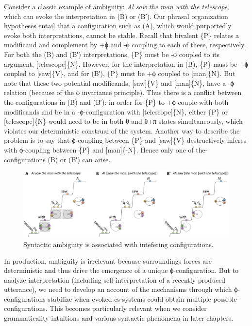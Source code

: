   Consider a classic example of ambiguity: \textit{Al saw the man with the telescope}, which can evoke the interpretation in {}(B) or (B′). Our phrasal organization hypotheses entail that a configuration such as (A), which would purportedly evoke both interpretations, cannot be stable. Recall that bivalent \{P\} relates a modificand and complement by +ϕ and -ϕ coupling to each of these, respectively. For both the (B) and (B′) interpretations, \{P\} must be -ϕ coupled to its argument, [telescope]\{N\}. However, for the interpretation in (B), \{P\} must be +ϕ coupled to [saw]\{V\}, and for (B′), \{P\} must be +ϕ coupled to [man]\{N\}. But note that these two potential modificands, [saw]\{V\} and [man]\{N\}, have a -ϕ relation (because of the ϕ invariance principle). Thus there is a conflict between the-configurations in (B) and (B′): in order for \{P\} to +ϕ couple with both modificands and be in a -ϕ-configuration with [telescope]\{N\}, either \{P\} or [telescope]\{N\} would need to be in both θ and θ+π states simultaneously, which violates our deterministic construal of the system. Another way to describe the problem is to say that ϕ-coupling between \{P\} and [saw]\{V\} destructively inferes with ϕ-coupling between \{P\} and [man]\{-N\}. Hence only one of the-configurations (B) or (B′) can arise.

  
\begin{figure}
\includegraphics[width=\textwidth]{figures/Tilsen-img89.png}
\caption{Syntactic ambiguity is associated with intefering configurations.}
\label{fig:4:39}
\end{figure}
 

  In production, ambiguity is irrelevant because surroundings forces are deterministic and thus drive the emergence of a unique ϕ-configuration. But to analyze interpretation (including self-interpretation of a recently produced utterance), we need to develop an account of the mechanisms through which ϕ-configurations stabilize when evoked cs-systems could obtain multiple possible-configurations. This becomes particularly relevant when we consider grammaticality intuitions and various syntactic phenomena in later chapters.

